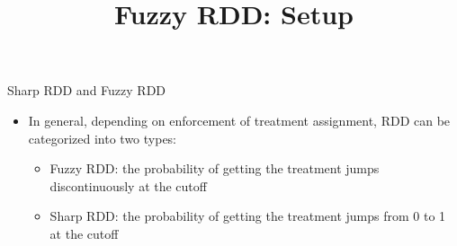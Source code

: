 \documentclass[hyperref={pdfpagelabels=false}]{beamer}
\begin{document}
\begin{frame}{Sharp RDD and Fuzzy RDD}{}
	
	\begin{itemize} 
		
		\item In general, depending on enforcement of treatment assignment, RDD can be categorized into two types:
		
				\begin{itemize} 	
		\vspace{0.2cm}
		
				\item[1] {\color{blue}Fuzzy RDD}: the probability of getting the treatment jumps discontinuously at the cutoff 
		\vspace{0.2cm}
		
		\item[2] {\color{blue}Sharp RDD}: the probability of getting the treatment jumps from 0 to 1 at the cutoff 

%			
%			
		\vspace{0.2cm}
		

%			
		
			\end{itemize}
		
	\end{itemize}
\end{frame}

\title[]
{Fuzzy RDD: Setup}

\author
{}

\institute{}
\end{document}
